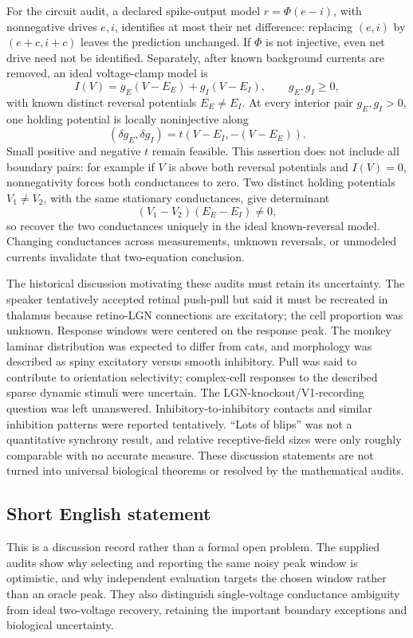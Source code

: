 \documentclass[11pt]{article}
\begin{document}
For the circuit audit, a declared spike-output model \(r=\Phi(e-i)\), with nonnegative drives \(e,i\), identifies at most their net difference: replacing \((e,i)\) by \((e+c,i+c)\) leaves the prediction unchanged. If \(\Phi\) is not injective, even net drive need not be identified. Separately, after known background currents are removed, an ideal voltage-clamp model is
\[
 I(V)=g_E(V-E_E)+g_I(V-E_I),\qquad g_E,g_I\geq0,
\]
with known distinct reversal potentials \(E_E\neq E_I\). At every interior pair \(g_E,g_I>0\), one holding potential is locally noninjective along
\[
 (\delta g_E,\delta g_I)=t(V-E_I,-(V-E_E)).
\]
Small positive and negative \(t\) remain feasible. This assertion does not include all boundary pairs: for example if \(V\) is above both reversal potentials and \(I(V)=0\), nonnegativity forces both conductances to zero. Two distinct holding potentials \(V_1\neq V_2\), with the same stationary conductances, give determinant
\[
 (V_1-V_2)(E_E-E_I)\neq0,
\]
so recover the two conductances uniquely in the ideal known-reversal model. Changing conductances across measurements, unknown reversals, or unmodeled currents invalidate that two-equation conclusion.

The historical discussion motivating these audits must retain its uncertainty. The speaker tentatively accepted retinal push-pull but said it must be recreated in thalamus because retino-LGN connections are excitatory; the cell proportion was unknown. Response windows were centered on the response peak. The monkey laminar distribution was expected to differ from cats, and morphology was described as spiny excitatory versus smooth inhibitory. Pull was said to contribute to orientation selectivity; complex-cell responses to the described sparse dynamic stimuli were uncertain. The LGN-knockout/V1-recording question was left unanswered. Inhibitory-to-inhibitory contacts and similar inhibition patterns were reported tentatively. ``Lots of blips'' was not a quantitative synchrony result, and relative receptive-field sizes were only roughly comparable with no accurate measure. These discussion statements are not turned into universal biological theorems or resolved by the mathematical audits.
\subsection{Short English statement}
This is a discussion record rather than a formal open problem. The supplied audits show why selecting and reporting the same noisy peak window is optimistic, and why independent evaluation targets the chosen window rather than an oracle peak. They also distinguish single-voltage conductance ambiguity from ideal two-voltage recovery, retaining the important boundary exceptions and biological uncertainty.
\end{document}
